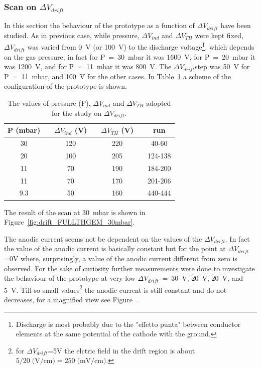 \documentclass[a4paper, 11 pt]{report}
\newcommand{\Vind}{$\Delta V_{ind}$}
\newcommand{\Vthgem}{$\Delta V_{TH}$}
\newcommand{\Vdrift}{$ \Delta V_{drift}$}
\begin{document}
\subsubsection{Scan on \Vdrift}
In this section the behaviour of the prototype as a function of \Vdrift{} have been studied.
As in previous case, while pressure, \Vind{} and \Vthgem{} were kept fixed, \Vdrift{} was varied 
from 0~V (or 100~V) to the discharge voltage\footnote{Discharge is most probably due to the 
"effetto punta" between conductor elements at the same potential of the cathode with the ground.}, 
which depends on the gas pressure; in fact for P~=~30~mbar it was 1600~V, for P~=~20~mbar it was 
1200~V, and for P~=~11~mbar it was 800~V.
The \Vdrift step was 50~V for P~=~11~mbar, and 100~V for the other cases.
In Table~\ref{tab:FULLTHGEM_vdrift} a scheme of the configuration of the  prototype is shown.
\begin{table} [!h]
	\begin{center}
		\renewcommand{\arraystretch}{1.2}
		\begin{tabular} {ccccccc}
			P (mbar) & & \Vind{} (V) & & \Vthgem{} (V) & & run\\
			\toprule[0.1em]
			30	& &	120	& &	220 & & 40-60\\
			20	& &	100	& & 205 & & 124-138\\
			11	& & 70	& & 190 & & 184-200\\
			11	& & 70	& & 170 & & 201-206\\
			9.3 & & 50  & & 160 & & 440-444\\
			\bottomrule[0.1em]
		\end{tabular}
	\end{center}
	\caption{The values of pressure (P), \Vind{} and \Vthgem{} adopted for the study on \Vdrift.} 
	\label{tab:FULLTHGEM_vdrift}
\end{table}

The result of the scan at 30~mbar is shown in Figure~\ref{fig:drift_FULLTHGEM_30mbar}. 

The anodic current seems not be dependent on the values of the \Vdrift. In fact the value of the 
anodic current is basically constant but for the point at \Vdrift=0V where, surprisingly, a 
value  of the anodic current different from zero is observed. For the sake of curiosity further 
measurements were done to investigate the behaviour of the prototype at very low \Vdrift~=~30~V, 
20~V, 20~V, and 5~V. Till so small values\footnote{for \Vdrift=5V the elctric field in the drift region
is about $5/20\; \mbox{(V/cm)}= 250 \; \mbox{(mV/cm)}$.} the anodic current is still constant and do not 
decreases, for a magnified view see Figure~\textcolor{red}.
\end{document}
